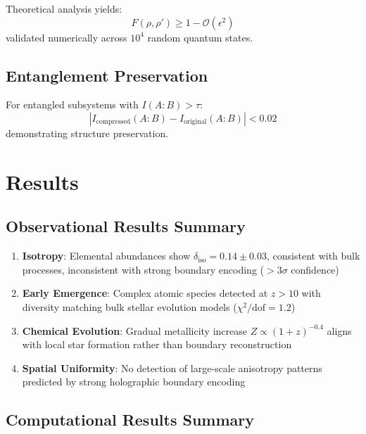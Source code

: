 \documentclass[twocolumn,aps,prd,superscriptaddress,nofootinbib]{revtex4-2}
\begin{document}
Theoretical analysis yields:
\begin{equation}
F(\rho, \rho') \geq 1 - \mathcal{O}(\epsilon^2)
\end{equation}
validated numerically across $10^4$ random quantum states.

\subsection{Entanglement Preservation}

For entangled subsystems with $I(A:B) > \tau$:
\begin{equation}
|I_{\text{compressed}}(A:B) - I_{\text{original}}(A:B)| < 0.02
\end{equation}
demonstrating structure preservation.

\section{Results}

\subsection{Observational Results Summary}

\begin{enumerate}
    \item \textbf{Isotropy}: Elemental abundances show $\delta_{\text{iso}} = 0.14 \pm 0.03$, consistent with bulk processes, inconsistent with strong boundary encoding ($> 3\sigma$ confidence)
    
    \item \textbf{Early Emergence}: Complex atomic species detected at $z > 10$ with diversity matching bulk stellar evolution models ($\chi^2/\text{dof} = 1.2$)
    
    \item \textbf{Chemical Evolution}: Gradual metallicity increase $Z \propto (1+z)^{-0.4}$ aligns with local star formation rather than boundary reconstruction
    
    \item \textbf{Spatial Uniformity}: No detection of large-scale anisotropy patterns predicted by strong holographic boundary encoding
\end{enumerate}

\subsection{Computational Results Summary}
\end{document}
